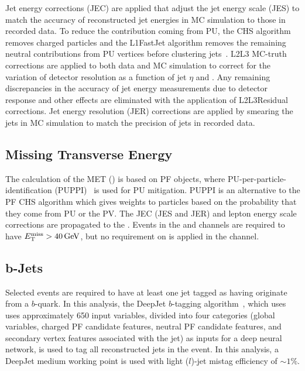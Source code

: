Jet energy corrections (JEC) are applied that adjust the jet energy scale (JES) to match the accuracy of reconstructed jet energies in MC simulation to those in recorded data.
To reduce the contribution coming from PU, the CHS algorithm removes charged particles and the L1FastJet algorithm removes the remaining neutral contributions from PU vertices before clustering jets~\cite{bib:JME18001}.
L2L3 MC-truth corrections are applied to both data and MC simulation to correct for the variation of detector resolution as a function of jet $\eta$ and \pT.
Any remaining discrepancies in the accuracy of jet energy measurements due to detector response and other effects are eliminated with the application of L2L3Residual corrections.
Jet energy resolution (JER) corrections are applied by smearing the jets in MC simulation to match the precision of jets in recorded data.

\subsection{Missing Transverse Energy}
The calculation of the MET (\ETmiss) is based on PF objects, where PU-per-particle-identification (PUPPI)~\cite{bib:PUPPI} is used for PU mitigation.
PUPPI is an alternative to the PF CHS algorithm which gives weights to particles based on the probability that they come from PU or the PV.
The JEC (JES and JER) and lepton energy scale corrections are propagated to the \ETmiss.
Events in the \mumu and \ee channels are required to have $\ETmiss > \SI{40}{\GeV}$, but no requirement on \ETmiss is applied in the \emu channel.

\subsection{b-Jets}
Selected events are required to have at least one jet tagged as having originate from a $b$-quark.
In this analysis, the DeepJet $b$-tagging algorithm~\cite{bib:Bols_2020}, which uses uses approximately 650 input variables, divided into four categories (global variables, charged PF candidate features, neutral PF candidate features, and secondary vertex features associated with the jet) as inputs for a deep neural network, is used to tag all reconstructed jets in the event.
In this analysis, a DeepJet medium working point is used with light ($l$)-jet mistag efficiency of $\sim 1\%$.

